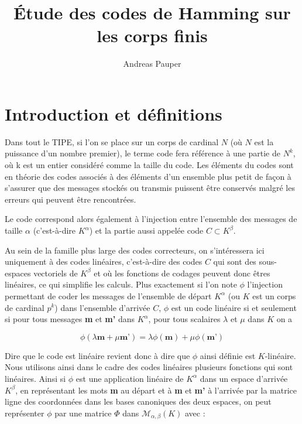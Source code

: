 \documentclass[10pt]{article}
\title{Étude des codes de Hamming sur les corps finis}
\author{Andreas Pauper}
\date{}
\begin{document}
\maketitle

\section{Introduction et définitions}

Dans tout le TIPE, si l'on se place sur un corps de cardinal $N$ (où $N$ est la puissance d'un nombre premier), le terme code fera référence à une partie de $ N^{k} $, où k est un entier considéré comme la taille du code.
Les éléments du codes sont en théorie des codes associés à des éléments d'un ensemble plus petit de façon à s'assurer que des messages stockés ou transmis puissent être conservés malgré les erreurs qui peuvent être rencontrées.

Le code correspond alors également à l'injection entre l'ensemble des messages de taille $\alpha$ (c'est-à-dire $K^{\alpha}$) et la partie aussi appelée code $C \subset K^{\beta}$.

Au sein de la famille plus large des codes correcteurs, on s'intéressera ici uniquement à des codes linéaires, c'est-à-dire des codes $C$ qui sont des sous-espaces vectoriels de $K^{\beta}$ et où les fonctions de codages peuvent donc êtres linéaires, ce qui simplifie les calculs.
Plus exactement si l'on note $\phi$ l'injection permettant de coder les messages de l'ensemble de départ $K^{\alpha}$ (ou $K$ est un corps de cardinal $p^{k}$) dans l'ensemble d'arrivée $C$, $\phi$ est un code linéaire si et seulement si pour tous messages \textbf{m} et \textbf{m'} dans $K^{\alpha}$, pour tous scalaires $\lambda$ et $\mu$ dans $K$ on a

\begin{displaymath}
\phi (\lambda \textbf{m}+ \mu \textbf{m'})=\lambda  \phi(\textbf{m})+\mu  \phi(\textbf{m'})
\end{displaymath}

Dire que le code est linéaire revient donc à dire que $\phi$ ainsi définie est $K$-linéaire. Nous utilisons ainsi dans le cadre des codes linéaires plusieurs fonctions qui sont linéaires.
Ainsi si $\phi$ est une application linéaire de $K^{\alpha}$ dans un espace d'arrivée $K^{\beta}$, en représentant les mots \textbf{m} au départ et à \textbf{m} et \textbf{m'} à l'arrivée par la matrice ligne des coordonnées dans les bases canoniques des deux espaces, on peut représenter $\phi$ par une matrice $\Phi$ dans $\mathcal{M}_{\alpha,\beta}(K)$ avec :
\end{document}
